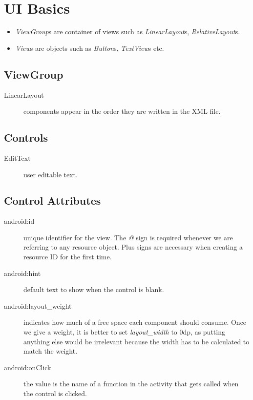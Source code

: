 \documentclass[a4paper, 12pt]{article}
\begin{document}
\section{UI Basics}
\begin{itemize}
	\item \emph{ViewGroup}s are container of views such as \emph{LinearLayout}s, \emph{RelativeLayout}s.
	\item \emph{View}s are objects such as \emph{Button}s, \emph{TextView}s etc.
\end{itemize}

\subsection{ViewGroup}
\begin{description}
	\item[LinearLayout] components appear in the order they are written in the XML file.
\end{description}

\subsection{Controls}
\begin{description}
	\item[EditText] user editable text.	
\end{description}

\subsection{Control Attributes}
\begin{description}
	\item[android:id] unique identifier for the view. The \emph{@} sign is required whenever we are referring to any resource object. Plus signs are necessary when creating a resource ID for the first time.
	\item[android:hint] default text to show when the control is blank.
	\item[android:layout\_weight] indicates how much of a free space each component should consume. Once we give a weight, it is better to set \emph{layout\_width} to 0dp, as putting anything else would be irrelevant because the width has to be calculated to match the weight.
	\item[android:onClick] the value is the name of a function in the activity that gets called when the control is clicked.
\end{description}
\end{document}
